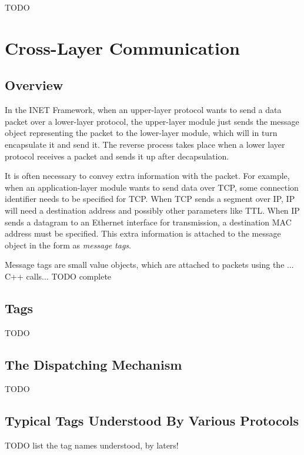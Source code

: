 \ifdraft TODO

\chapter{Cross-Layer Communication}
\label{cha:cross-layer-communication}

\section{Overview}

In the INET Framework, when an upper-layer protocol wants to send a data
packet over a lower-layer protocol, the upper-layer module just sends the
message object representing the packet to the lower-layer module, which
will in turn encapsulate it and send it. The reverse process takes place
when a lower layer protocol receives a packet and sends it up after
decapsulation.

It is often necessary to convey extra information with the packet. For
example, when an application-layer module wants to send data over TCP, some
connection identifier needs to be specified for TCP. When TCP sends a
segment over IP, IP will need a destination address and possibly other
parameters like TTL. When IP sends a datagram to an Ethernet interface for
transmission, a destination MAC address must be specified. This extra
information is attached to the message object in the form as \textit{message tags}.

Message tags are small value objects, which are attached to packets using 
the ... C++ calls...  TODO complete

 

\section{Tags}

TODO

\section{The Dispatching Mechanism}

TODO

\section{Typical Tags Understood By Various Protocols}

TODO list the tag names understood, by laters!

\fi


